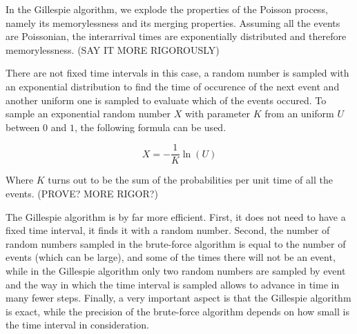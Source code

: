 In the Gillespie algorithm, we explode the properties of the Poisson process, namely its memorylessness and its merging properties. Assuming all the events are Poissonian, the interarrival times are exponentially distributed and therefore memorylessness. \cite{bertsekas08} (SAY IT MORE RIGOROUSLY) 

There are not fixed time intervals in this case, a random number is sampled with an exponential distribution to find the time of occurence of the next event and another uniform one is sampled to evaluate which of the events occured. To sample an exponential random number $X$ with parameter $K$ from an uniform $U$ between $0$ and $1$, the following formula can be used.

\begin{equation}
  X = -\frac{1}{K}\ln(U)
\end{equation}

Where $K$ turns out to be the sum of the probabilities per unit time of all the events. (PROVE? MORE RIGOR?)

The Gillespie algorithm is by far more efficient. First, it does not need to have a fixed time interval, it finds it with a random number. Second, the number of random numbers sampled in the brute-force algorithm is equal to the number of events (which can be large), and some of the times there will not be an event, while in the Gillespie algorithm only two random numbers are sampled by event and the way in which the time interval is sampled allows to advance in time in many fewer steps. Finally, a very important aspect is that the Gillespie algorithm is exact, while the precision of the brute-force algorithm depends on how small is the time interval in consideration.

